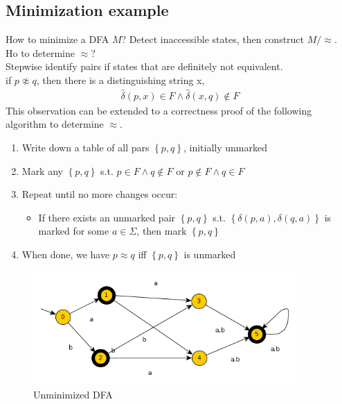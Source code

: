 \documentclass[a4paper]{article}
\begin{document}
    \subsection{Minimization example}
    How to minimize a DFA $M$? Detect inaccessible states, then construct $M/\approx$.
    \\Ho to determine $\approx$?\\
    Stepwise identify pairs if states that are definitely not equivalent.\\
    if $p  \not \approx q$, then there is a distinguishing string x,
    \begin{align*}
        \hat{\delta}(p,x)\in F \land \hat{\delta}(x,q) \notin F
    \end{align*}
    This observation can be extended to a correctness proof of the following algorithm
    to determine $\approx$.
    \begin{enumerate}
        \item Write down a table of all pars $\left\{ p,q \right\}$, initially unmarked
        \item Mark any $\left\{ p,q \right\}$ s.t. $p\in F \land q\not \in F$
            or $p\not\in F \land q\in F$
        \item Repeat until no more changes occur:
            \begin{itemize}
                \item If there exists an unmarked pair $\left\{ p,q \right\}$ s.t.
                    $\left\{ \delta(p,a), \delta(q,a) \right\}$ is marked
                    for some $a\in \Sigma$, then mark $\left\{ p,q \right\}$
            \end{itemize}
        \item When done, we have $p\approx q$ iff $\left\{ p,q \right\}$ is unmarked
    \end{enumerate}
    \begin{figure}[H]
        \centering
        \includegraphics[width=0.9\textwidth]{unminimized.png}
        \caption{Unminimized DFA}
    \end{figure}
\end{document}
